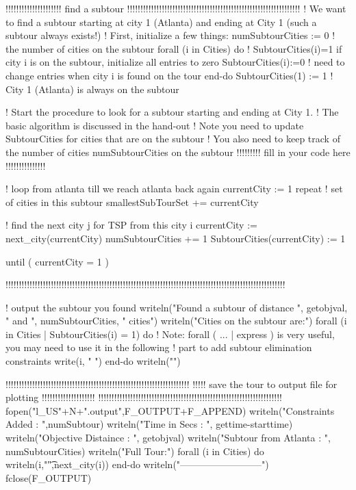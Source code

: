 \documentclass[twoside,12pt]{article}
\begin{document}
\begin{verbatim*}
	!!!!!!!!!!!!!!!!!!!!!  find a subtour !!!!!!!!!!!!!!!!!!!!!!!!!!!!!!!!!!!!!!!!!!!!!!!!!!!!!!!!!!!!!!!!!
	! We want to find a subtour starting at city 1 (Atlanta) and ending at City 1 (such a subtour always exists!)
	! First, initialize a few things:
	numSubtourCities := 0    ! the number of cities on the subtour
	forall (i in Cities) do  ! SubtourCities(i)=1 if city i is on the subtour, initialize all entries to zero
		SubtourCities(i):=0  ! need to change entries when city i is found on the tour
	end-do
	SubtourCities(1) := 1  ! City 1 (Atlanta) is always on the subtour
		
	! Start the procedure to look for a subtour starting and ending at City 1. 
	! The basic algorithm is discussed in the hand-out
	! Note you need to update SubtourCities for cities that are on the subtour 
	! You also need to keep track of the number of cities numSubtourCities on the subtour
	!!!!!!!!! fill in your code here !!!!!!!!!!!!!!!
	
	! loop from atlanta till we reach atlanta back again
	currentCity := 1
	repeat
		! set of cities in this subtour
		smallestSubTourSet += {currentCity}
		
		! find the next city j for TSP from this city i
		currentCity := next_city(currentCity)
		numSubtourCities += 1
		SubtourCities(currentCity) := 1
				
	until ( currentCity = 1 )
	
	!!!!!!!!!!!!!!!!!!!!!!!!!!!!!!!!!!!!!!!!!!!!!!!!!!!!!!!!!!!!!!!!!!!!!!!!!!!!!!!!!!!!!!!!!!!!!!!!!!!!!!!!!
	
	! output the subtour you found
	writeln("Found a subtour of distance ", getobjval, " and ", numSubtourCities, " cities")
	writeln("Cities on the subtour are:")
	forall (i in Cities | SubtourCities(i) = 1) do
	! Note: forall ( ... | express ) is very useful, you may need to use it in the following 
	! part to add subtour elimination constraints
		write(i, " ")
	end-do
	writeln("")
	
	!!!!!!!!!!!!!!!!!!!!!!!!!!!!!!!!!!!!!!!!!!!!!!!!!!!!!!!!!!!!!!!!!!!!!
	!!!!!  save the tour to output file for plotting !!!!!!!!!!!!!!!!!!!!
	!!!!!!!!!!!!!!!!!!!!!!!!!!!!!!!!!!!!!!!!!!!!!!!!!!!!!!!!!!!!!!!!!!!!!
	fopen("l_US"+N+".output",F_OUTPUT+F_APPEND)
	writeln("Constraints Added : ",numSubtour)
	writeln("Time in Secs : ", gettime-starttime)
	writeln("Objective Distaince : ", getobjval)
	writeln("Subtour from Atlanta : ", numSubtourCities)
	writeln("Full Tour:")
	forall (i in Cities) do
		writeln(i,"\t",next_city(i))
	end-do
	writeln("--------------------------")
	fclose(F_OUTPUT)
	

\end{verbatim*}
\end{document}
